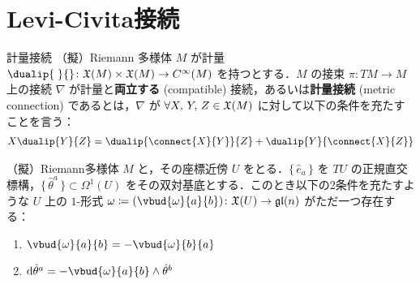 \documentclass[geometry_main]{subfiles}
\begin{document}
\section{Levi-Civita接続}

\begin{mydef}[label=def.compatible]{計量接続} 
	（擬）Riemann 多様体 $M$ が計量 $\dualip{\;}{}\colon \vecfield{M} \times \vecfield{M} \to \cinftyf{M}$ を持つとする．$M$ の接束 $\pi \colon TM \to M$ 上の接続 $\nabla$ が計量と\textbf{両立する} (compatible) 接続，あるいは\textbf{計量接続} (metric connection) であるとは，$\nabla$ が $\forall X,\, Y,\, Z \in \mathfrak{X}(M)$ に対して以下の条件を充たすことを言う：
	\begin{align} 
		X \dualip{Y}{Z} = \dualip{\connect{X}{Y}}{Z} + \dualip{Y}{\connect{X}{Z}}
	\end{align}
\end{mydef}

\begin{myprop}[label=prop.Levi-Civita]{}
	（擬）Riemann多様体 $M$ と，その座標近傍 $U$ をとる．$\{\, \hat{e}_a\, \}$ を $TU$ の正規直交標構，$\{\, \hat{\theta}^a \, \} \subset \Omega^1(U)$ をその双対基底とする．このとき以下の2条件を充たすような $U$ 上の $1$-形式 $\omega \coloneqq (\vbud{\omega}{a}{b}) \colon \vecfield{U} \to \mathfrak{gl}(n)$ がただ一つ存在する：
	\begin{enumerate} 
		\item $\vbud{\omega}{a}{b} = - \vbud{\omega}{b}{a}$
		\item $\dd{\hat{\theta}^a} = - \vbud{\omega}{a}{b} \wedge \hat{\theta}^b$
	\end{enumerate}
\end{myprop}
\end{document}
